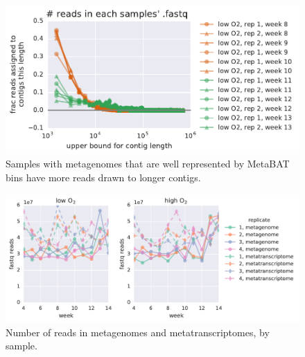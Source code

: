 \begin{figure}[H]
\centering
    \includegraphics[width=1.0\textwidth]{./tex/chapter2/figures/170124_bad_low_o2_samples_have_more_reads_on_short_contigs--binning_not_considered.pdf}
    \begin{singlespace}
    \caption[Samples best explained by bins have more reads drawn to longer contigs]{
        Samples with metagenomes that are well represented by MetaBAT bins have more reads drawn to longer contigs.}
    \label{fig:contig_dist}
    \end{singlespace}
\end{figure}

\begin{figure}[H]
\centering
    \includegraphics[width=1.0\textwidth]{./tex/chapter2/figures/170326_compare_raw_fastq_reads.pdf}
    \begin{singlespace}
    \caption[Number of reads in metagenomes and metatranscriptomes, by sample]{
        Number of reads in metagenomes and metatranscriptomes, by sample.}
    \label{fig:fastq_reads}
    \end{singlespace}
\end{figure}

